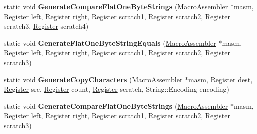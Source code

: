 \begin{DoxyCompactItemize}
\item 
static void {\bfseries Generate\+Compare\+Flat\+One\+Byte\+Strings} (\hyperlink{classv8_1_1internal_1_1_macro_assembler}{Macro\+Assembler} $\ast$masm, \hyperlink{structv8_1_1internal_1_1_register}{Register} left, \hyperlink{structv8_1_1internal_1_1_register}{Register} right, \hyperlink{structv8_1_1internal_1_1_register}{Register} scratch1, \hyperlink{structv8_1_1internal_1_1_register}{Register} scratch2, \hyperlink{structv8_1_1internal_1_1_register}{Register} scratch3, \hyperlink{structv8_1_1internal_1_1_register}{Register} scratch4)\hypertarget{classv8_1_1internal_1_1_string_helper_ac523db36072fd75b5d42b403ac6ef1ff}{}\label{classv8_1_1internal_1_1_string_helper_ac523db36072fd75b5d42b403ac6ef1ff}

\item 
static void {\bfseries Generate\+Flat\+One\+Byte\+String\+Equals} (\hyperlink{classv8_1_1internal_1_1_macro_assembler}{Macro\+Assembler} $\ast$masm, \hyperlink{structv8_1_1internal_1_1_register}{Register} left, \hyperlink{structv8_1_1internal_1_1_register}{Register} right, \hyperlink{structv8_1_1internal_1_1_register}{Register} scratch1, \hyperlink{structv8_1_1internal_1_1_register}{Register} scratch2, \hyperlink{structv8_1_1internal_1_1_register}{Register} scratch3)\hypertarget{classv8_1_1internal_1_1_string_helper_af4eb5dbd003a23d35fa965edcd1c4856}{}\label{classv8_1_1internal_1_1_string_helper_af4eb5dbd003a23d35fa965edcd1c4856}

\item 
static void {\bfseries Generate\+Copy\+Characters} (\hyperlink{classv8_1_1internal_1_1_macro_assembler}{Macro\+Assembler} $\ast$masm, \hyperlink{structv8_1_1internal_1_1_register}{Register} dest, \hyperlink{structv8_1_1internal_1_1_register}{Register} src, \hyperlink{structv8_1_1internal_1_1_register}{Register} count, \hyperlink{structv8_1_1internal_1_1_register}{Register} scratch, String\+::\+Encoding encoding)\hypertarget{classv8_1_1internal_1_1_string_helper_acd699f7bf40a599d86efca2556efde61}{}\label{classv8_1_1internal_1_1_string_helper_acd699f7bf40a599d86efca2556efde61}

\item 
static void {\bfseries Generate\+Compare\+Flat\+One\+Byte\+Strings} (\hyperlink{classv8_1_1internal_1_1_macro_assembler}{Macro\+Assembler} $\ast$masm, \hyperlink{structv8_1_1internal_1_1_register}{Register} left, \hyperlink{structv8_1_1internal_1_1_register}{Register} right, \hyperlink{structv8_1_1internal_1_1_register}{Register} scratch1, \hyperlink{structv8_1_1internal_1_1_register}{Register} scratch2, \hyperlink{structv8_1_1internal_1_1_register}{Register} scratch3)\hypertarget{classv8_1_1internal_1_1_string_helper_a7ac6a0492ad8bfd6d538d6d38be9881f}{}\label{classv8_1_1internal_1_1_string_helper_a7ac6a0492ad8bfd6d538d6d38be9881f}


\end{DoxyCompactItemize}
